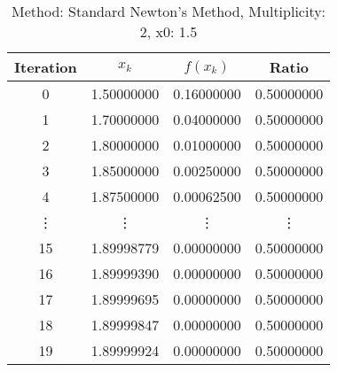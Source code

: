 \begin{table}
\centering
\caption{Method: Standard Newton's Method, Multiplicity: 2, x0: 1.5}
\label{tab:table_Standard_Newton's_Method_2_1_5}
\begin{tabular}{c c c c}
\toprule
Iteration &      $x_k$ &   $f(x_k)$ &      Ratio \\
\midrule
        0 & 1.50000000 & 0.16000000 & 0.50000000 \\
        1 & 1.70000000 & 0.04000000 & 0.50000000 \\
        2 & 1.80000000 & 0.01000000 & 0.50000000 \\
        3 & 1.85000000 & 0.00250000 & 0.50000000 \\
        4 & 1.87500000 & 0.00062500 & 0.50000000 \\
   \vdots &     \vdots &     \vdots &     \vdots \\
       15 & 1.89998779 & 0.00000000 & 0.50000000 \\
       16 & 1.89999390 & 0.00000000 & 0.50000000 \\
       17 & 1.89999695 & 0.00000000 & 0.50000000 \\
       18 & 1.89999847 & 0.00000000 & 0.50000000 \\
       19 & 1.89999924 & 0.00000000 & 0.50000000 \\
\bottomrule
\end{tabular}
\end{table}
